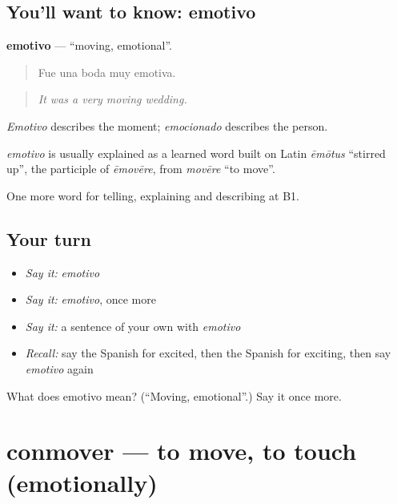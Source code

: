 \subsection*{You'll want to know: emotivo}
\textbf{emotivo} — \textquotedblleft{}moving, emotional\textquotedblright{}.

\begin{quote}
Fue una boda muy emotiva.
\end{quote}

\begin{quote}
\emph{It was a very moving wedding.}
\end{quote}

\emph{Emotivo} describes the moment; \emph{emocionado} describes the person.

\begin{cousinweb}
\emph{emotivo} is usually explained as a learned word built on Latin \emph{ēmōtus} \textquotedblleft{}stirred up\textquotedblright{}, the participle of \emph{ēmovēre}, from \emph{movēre} \textquotedblleft{}to move\textquotedblright{}.
\end{cousinweb}

\begin{grammarlens}[title={What you've built}]
One more word for telling, explaining and describing at B1.
\end{grammarlens}

\subsection*{Your turn}
\begin{itemize}
\raggedright
  \item \emph{Say it:} \emph{emotivo}
  \item \emph{Say it:} \emph{emotivo}, once more
  \item \emph{Say it:} a sentence of your own with \emph{emotivo}
  \item \emph{Recall:} say the Spanish for excited, then the Spanish for exciting, then say \emph{emotivo} again
\end{itemize}

\begin{tcolorbox}[breakable,colback=teal!4,colframe=teal!35!black,title={Before you move on}]
What does emotivo mean? (\textquotedblleft{}Moving, emotional\textquotedblright{}.) Say it once more.
\end{tcolorbox}
\section[conmover]{conmover — to move, to touch (emotionally)}

